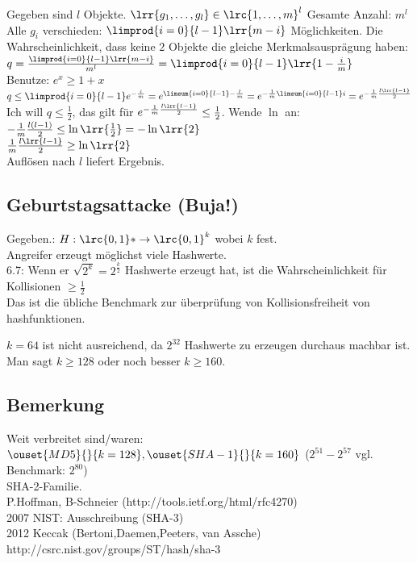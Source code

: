 	Gegeben sind $l$ Objekte. $\lrr{g_1,\dots,g_l}\in\lrc{1,\dots,m}^l$ Gesamte Anzahl: $m^l$\\
	Alle $g_i$ verschieden: $\limprod{i=0}{l-1}\lrr{m-i}$ Möglichkeiten. Die Wahrscheinlichkeit, dass keine $2$ Objekte die gleiche Merkmalsausprägung haben: $q=\frac{\limprod{i=0}{l-1}\lrr{m-i}}{m^l}=\limprod{i=0}{l-1}\lrr{1-\frac{i}{m}}$\\
	Benutze: $e^x\geq 1+x$\\
	$q\leq\limprod{i=0}{l-1}e^{-\frac{i}{m}}=e^{\limsum{i=0}{l-1}-\frac{l}{m}}=e^{-\frac{1}{m}\limsum{i=0}{l-1}i}=e^{-\frac{1}{m}\frac{l\lrr{l-1}}{2}}$\\
	Ich will $q\leq\frac{1}{2}$, das gilt für $e^{-\frac{1}{m}\frac{l\lrr{l-1}}{2}}\leq\frac{1}{2}$. Wende $\ln$ an:\\
	$-\frac{1}{m}\frac{l(l-1)}{2}\leq\ln\lrr{\frac{1}{2}}=-\ln\lrr{2}$\\
	$\frac{1}{m}\frac{l\lrr{l-1}}{2}\geq\ln\lrr{2}$\\
	Auflösen nach $l$ liefert Ergebnis.

\subsection{Geburtstagsattacke (Buja!)}
	Gegeben.: $H:\lrc{0,1}*\rightarrow\lrc{0,1}^k$ wobei $k$ fest.\\
	Angreifer erzeugt möglichst viele Hashwerte.\\
	6.7: Wenn er $\sqrt{2^k}=2^{\frac{k}{2}}$ Hashwerte erzeugt hat, ist die Wahrscheinlichkeit für Kollisionen $\geq\frac{1}{2}$\\
	Das ist die übliche Benchmark zur überprüfung von Kollisionsfreiheit von hashfunktionen.
	
	$k=64$ ist nicht ausreichend, da $2^32$ Hashwerte zu erzeugen durchaus machbar ist. Man sagt $k\geq 128$ oder noch besser $k\geq 160$.
	
\subsection{Bemerkung}
	Weit verbreitet sind/waren: $\ouset{MD5}{}{k=128}, \ouset{SHA-1}{}{k=160}$ ($2^{51}-2^{57}$ vgl. Benchmark: $2^{80}$)\\
	SHA-2-Familie.\\
	P.Hoffman, B-Schneier (http://tools.ietf.org/html/rfc4270)\\
	2007 NIST: Ausschreibung (SHA-3)\\
	2012 Keccak (Bertoni,Daemen,Peeters, van Assche)\\
	http://csrc.nist.gov/groups/ST/hash/sha-3
	

